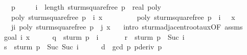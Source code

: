 \begin{isabellebody}
\ \ \ {\isachardoublequoteopen}p\ {\isasymnoteq}\ {}{\isachardoublequoteclose}\isanewline
\ \ \ {\isachardoublequoteopen}i\ {\isacharless}\ length\ {\isacharparenleft}sturm{\isacharunderscore}squarefree{\isacharprime}\ {\isacharparenleft}p\ {\isacharcolon}{\isacharcolon}\ real\ poly{\isacharparenright}{\isacharparenright}\ {\isacharminus}\ {}{\isachardoublequoteclose}\isanewline
\ \ \ {\isachardoublequoteopen}poly\ {\isacharparenleft}sturm{\isacharunderscore}squarefree{\isacharprime}\ p\ {\isacharbang}\ i{\isacharparenright}\ x\ {\isacharequal}\ {}{\isachardoublequoteclose}\isanewline
\ \ \ \ \ \ \ {\isachardoublequoteopen}poly\ {\isacharparenleft}sturm{\isacharunderscore}squarefree{\isacharprime}\ p\ {\isacharbang}\ {\isacharparenleft}i\ {\isacharplus}\ {}{\isacharparenright}{\isacharparenright}\ x\ {\isacharequal}\ {}{\isachardoublequoteclose}\isanewline
\ \ \ {\isachardoublequoteopen}{\isasymforall}j{\isasymle}i{\isacharplus}{}{\isachardot}\ poly\ {\isacharparenleft}sturm{\isacharunderscore}squarefree{\isacharprime}\ p\ {\isacharbang}\ j{\isacharparenright}\ x\ {\isacharequal}\ {}{\isachardoublequoteclose}\isanewline
%
\isadelimproof
%
\endisadelimproof
%
\isatagproof
{}\isamarkupfalse%
\ {\isacharparenleft}intro\ sturm{\isacharunderscore}adjacent{\isacharunderscore}root{\isacharunderscore}aux{\isacharbrackleft}OF\ assms{\isacharparenleft}{}{\isacharcomma}{}{\isacharcomma}{}{\isacharparenright}{\isacharbrackright}{\isacharparenright}\isanewline
\ \ \isamarkupfalse%
\ {\isacharparenleft}goal{}\ i\ x{\isacharparenright}\isanewline
\ \ \ \ \isamarkupfalse%
\ q\ {\isasymequiv}\ {\isachardoublequoteopen}sturm\ p\ {\isacharbang}\ i{\isachardoublequoteclose}\ \isanewline
\ \ \ \ \isamarkupfalse%
\ r\ {\isasymequiv}\ {\isachardoublequoteopen}sturm\ p\ {\isacharbang}\ {\isacharparenleft}Suc\ i{\isacharparenright}{\isachardoublequoteclose}\isanewline
\ \ \ \ \isamarkupfalse%
\ s\ {\isasymequiv}\ {\isachardoublequoteopen}sturm\ p\ {\isacharbang}\ {\isacharparenleft}Suc\ {\isacharparenleft}Suc\ i{\isacharparenright}{\isacharparenright}{\isachardoublequoteclose}\isanewline
\ \ \ \ \isamarkupfalse%
\ d\ {\isasymequiv}\ {\isachardoublequoteopen}gcd\ p\ {\isacharparenleft}pderiv\ p{\isacharparenright}{\isachardoublequoteclose}\isanewline
\ \ \ \ \isamarkupfalse%

\end{isabellebody}
